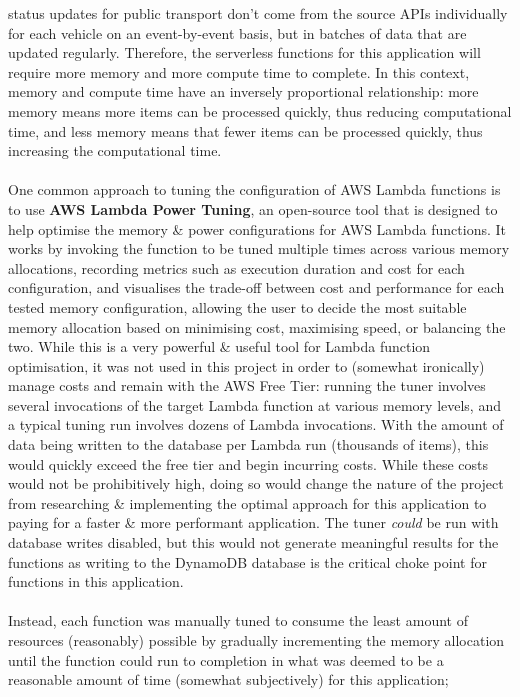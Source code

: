 \documentclass[a4paper,11pt]{report}
\begin{document}
status updates for public transport don't come from the source APIs individually for each vehicle on an event-by-event basis, but in batches of data that are updated regularly.
Therefore, the serverless functions for this application will require more memory and more compute time to complete.
In this context, memory and compute time have an inversely proportional relationship:
more memory means more items can be processed quickly, thus reducing computational time, and less memory means that fewer items can be processed quickly, thus increasing the computational time.
\\\\
One common approach to tuning the configuration of AWS Lambda functions is to use \textbf{AWS Lambda Power Tuning}\supercite{awsPowerTuning}, an open-source tool that is designed to help optimise the memory \& power configurations for AWS Lambda functions.
It works by invoking the function to be tuned multiple times across various memory allocations, recording metrics such as execution duration and cost for each configuration, and visualises the trade-off between cost and performance for each tested memory configuration, allowing the user to decide the most suitable memory allocation based on minimising cost, maximising speed, or balancing the two.
While this is a very powerful \& useful tool for Lambda function optimisation, it was not used in this project in order to (somewhat ironically) manage costs and remain with the AWS Free Tier:
running the tuner involves several invocations of the target Lambda function at various memory levels, and a typical tuning run involves dozens of Lambda invocations.
With the amount of data being written to the database per Lambda run (thousands of items), this would quickly exceed the free tier and begin incurring costs.
While these costs would not be prohibitively high, doing so would change the nature of the project from researching \& implementing the optimal approach for this application to paying for a faster \& more performant application.
The tuner \textit{could} be run with database writes disabled, but this would not generate meaningful results for the functions as writing to the DynamoDB database is the critical choke point for functions in this application.
\\\\
Instead, each function was manually tuned to consume the least amount of resources (reasonably) possible by gradually incrementing the memory allocation until the function could run to completion in what was deemed to be a reasonable amount of time (somewhat subjectively) for this application;
\end{document}

